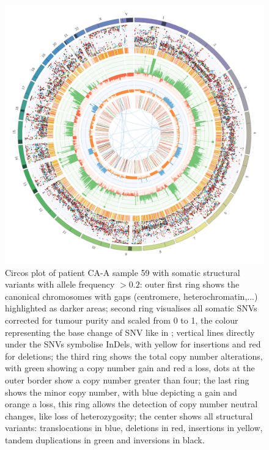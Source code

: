 \begin{figure}[!ht]
\centering
\includegraphics[width=.99\linewidth]{Figures/CASCADE/CA99/CA99-59.circos.png}
\caption[Circos plot of patient CA-A sample 59]{Circos plot of patient CA-A sample 59 with somatic structural variants with allele frequency $> 0.2$: outer first ring shows the canonical chromosomes with gaps (centromere, heterochromatin,...) highlighted as darker areas; second ring visualises all somatic SNVs corrected for tumour purity and scaled from 0 to 1, the colour representing the base change of SNV like in \protect\textcite{Alexandrov2013}; vertical lines directly under the SNVs symbolise InDels, with yellow for insertions and red for deletions; the third ring shows the total copy number alterations, with green showing a copy number gain and red a loss, dots at the outer border show a copy number greater than four; the last ring shows the minor copy number, with blue depicting a gain and orange a loss, this ring allows the detection of copy number neutral changes, like loss of heterozygosity; the center shows all structural variants: translocations in blue, deletions in red, insertions in yellow, tandem duplications in green and inversions in black.} \label{fig:ca99.59circos}
\end{figure}

\cleardoublepage

